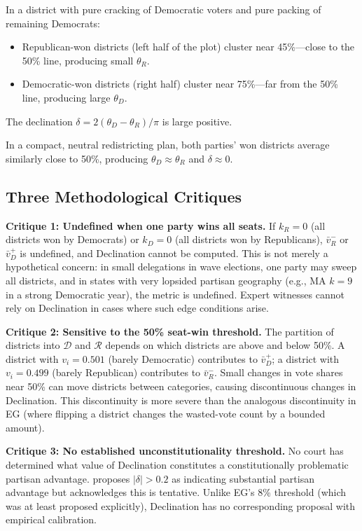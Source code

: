 In a district with pure cracking of Democratic voters and pure packing of remaining
Democrats:
\begin{itemize}
\item Republican-won districts (left half of the plot) cluster near 45\%---close to
  the 50\% line, producing small $\theta_R$.
\item Democratic-won districts (right half) cluster near 75\%---far from the 50\%
  line, producing large $\theta_D$.
\end{itemize}
The declination $\delta = 2(\theta_D - \theta_R)/\pi$ is large positive.

In a compact, neutral redistricting plan, both parties' won districts average
similarly close to 50\%, producing $\theta_D \approx \theta_R$ and $\delta \approx 0$.

\subsection{Three Methodological Critiques}

\textbf{Critique 1: Undefined when one party wins all seats.}
If $k_R = 0$ (all districts won by Democrats) or $k_D = 0$ (all districts won by
Republicans), $\bar{v}_R^-$ or $\bar{v}_D^+$ is undefined, and Declination cannot
be computed. This is not merely a hypothetical concern: in small delegations in
wave elections, one party may sweep all districts, and in states with very lopsided
partisan geography (e.g., MA $k=9$ in a strong Democratic year), the metric is
undefined. Expert witnesses cannot rely on Declination in cases where such edge
conditions arise.

\textbf{Critique 2: Sensitive to the 50\% seat-win threshold.}
The partition of districts into $\mathcal{D}$ and $\mathcal{R}$ depends on which
districts are above and below 50\%. A district with $v_i = 0.501$ (barely Democratic)
contributes to $\bar{v}_D^+$; a district with $v_i = 0.499$ (barely Republican)
contributes to $\bar{v}_R^-$. Small changes in vote shares near 50\% can move
districts between categories, causing discontinuous changes in Declination. This
discontinuity is more severe than the analogous discontinuity in EG (where flipping
a district changes the wasted-vote count by a bounded amount).

\textbf{Critique 3: No established unconstitutionality threshold.}
No court has determined what value of Declination constitutes a constitutionally
problematic partisan advantage. \citet{warrington2018} proposes $|\delta| > 0.2$
as indicating substantial partisan advantage but acknowledges this is tentative.
Unlike EG's 8\% threshold (which was at least proposed explicitly), Declination
has no corresponding proposal with empirical calibration.
